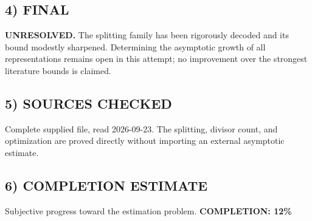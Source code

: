 \subsection*{4) FINAL}
\textbf{UNRESOLVED.} The splitting family has been rigorously decoded and its bound modestly sharpened. Determining the asymptotic growth of all representations remains open in this attempt; no improvement over the strongest literature bounds is claimed.
\subsection*{5) SOURCES CHECKED}
Complete supplied file, read 2026-09-23. The splitting, divisor count, and optimization are proved directly without importing an external asymptotic estimate.
\subsection*{6) COMPLETION ESTIMATE}
Subjective progress toward the estimation problem.
\textbf{COMPLETION: 12\%}
